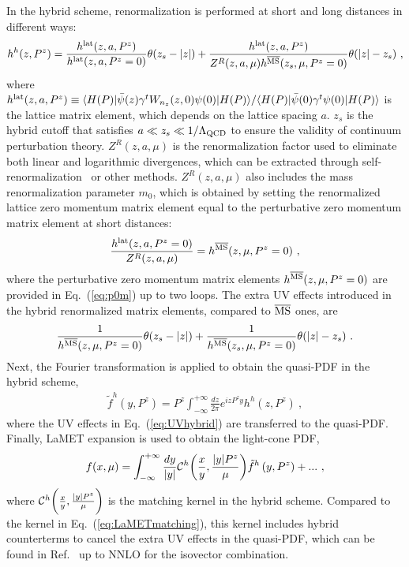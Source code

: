 \documentclass[a4paper,11pt]{article}
\begin{document}
In the hybrid scheme, renormalization is performed at short and long distances in different ways: 
\begin{align}\label{eq:hybridrenorm}
h^{h}(z,P^z) = \frac{h^{\rm lat}(z,a,P^z)}{h^{\rm lat}(z,a,P^z=0)}\theta(z_s-|z|)+\frac{h^{\rm lat}(z,a,P^z)}{Z^{R}(z,a,\mu) h^{\rm \overline{MS}}(z_s,\mu,P^z=0)}\theta(|z|-z_s) \ ,
\end{align}
where $h^{\rm lat}(z,a,P^z) \equiv \langle H(P)| \bar{\psi}(z) \gamma^{t} W_{n_z}(z,0) \psi (0) |H(P) \rangle / \langle H(P)| \bar{\psi}(0) \gamma^{t} \psi (0) |H(P) \rangle$ is the lattice matrix element, which depends on the lattice spacing $a$. $z_{s}$ is the hybrid cutoff that satisfies $a \ll z_s \ll 1/\Lambda_{\rm QCD}$ to ensure the validity of continuum perturbation theory. $Z^{R}(z,a,\mu)$ is the renormalization factor used to eliminate both linear and logarithmic divergences, which can be extracted through self-renormalization~\cite{LatticePartonCollaborationLPC:2021xdx} or other methods. $Z^{R}(z,a,\mu)$ also includes the mass renormalization parameter $m_0$, which is obtained by setting the renormalized lattice zero momentum matrix element equal to the perturbative zero momentum matrix element at short distances:
\begin{align}\label{eq:Hyrenormfit}
    \frac{h^{\rm lat}(z,a,P^z=0)}{Z^{R}(z,a,\mu)} = h^{\rm \overline{MS}}(z,\mu,P^z=0) \ ,
\end{align}
where the perturbative zero momentum matrix elements $h^{\rm \overline{MS}}(z,\mu,P^z=0)$ are provided in Eq.~(\ref{eq:p0m}) up to two loops. The extra UV effects introduced in the hybrid renormalized matrix elements, compared to $\overline{\rm MS}$ ones, are
\begin{align}\label{eq:UVhybrid}
    \frac{1}{h^{\rm \overline{MS}}(z,\mu,P^z=0)}\theta(z_s-|z|) + \frac{1}{h^{\rm \overline{MS}}(z_s,\mu,P^z=0)}\theta(|z|-z_s) \ .
\end{align}
Next, the Fourier transformation is applied to obtain the quasi-PDF in the hybrid scheme,
\begin{align}\label{eq:FT}
    \tilde f^{h}(y,P^z) = P^z \int_{-\infty}^{+\infty} \frac{d z}{2\pi} e^{i z P^z y} h^{h}(z,P^z) \ ,
\end{align}
where the UV effects in Eq.~(\ref{eq:UVhybrid}) are transferred to the quasi-PDF. Finally, LaMET expansion is used to obtain the light-cone PDF, 
\begin{align}\label{eq:matchhybrid}
f(x,\mu)=\int_{-\infty}^{+\infty} \frac{d y}{|y|}{\cal C}^{h}\bigg(\frac{x}{y},\frac{|y| P^z}{\mu}\bigg)\tilde f^{h}\left(y,P^z\right) + ... \ ,
\end{align}
where ${\cal C}^{h}\bigg(\frac{x}{y},\frac{|y| P^z}{\mu}\bigg)$ is the matching kernel in the hybrid scheme. Compared to the kernel in Eq.~(\ref{eq:LaMETmatching}), this kernel includes hybrid counterterms to cancel the extra UV effects in the quasi-PDF, which can be found in Ref.~\cite{Su:2022fiu} up to NNLO for the isovector combination.
\end{document}
